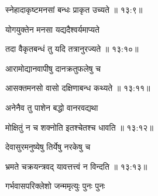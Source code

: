 
{\devanagarifont स्नेहादाकृष्टमनसां बन्धः प्राकृत उच्यते {॥ १३:९॥} \veg\dontdisplaylinenum }%

{\devanagarifont योगयुक्तेन मनसा यद्यदैश्वर्यमाप्यते \thinspace{\dandab} \dontdisplaylinenum }%
 

{\devanagarifont तदा वैकृतबन्धं तु यदि तत्रानुरज्यते {॥ १३:१०॥} \veg\dontdisplaylinenum }%

{\devanagarifont आरामोद्यानवापीषु दानक्रतुफलेषु च \thinspace{\dandab} \dontdisplaylinenum }%
 

{\devanagarifont आसक्तमनसो वासो दक्षिणाबन्ध कथ्यते {॥ १३:११॥} \veg\dontdisplaylinenum }%

{\devanagarifont अनेनैव तु पाशेन बद्धो वानरवद्यथा \thinspace{\dandab} \dontdisplaylinenum }%


{\devanagarifont मोक्षितुं न च शक्नोति इतश्चेतश्च धावति {॥ १३:१२॥} \veg\dontdisplaylinenum }%
 
{\devanagarifont देवासुरमनुष्येषु तिर्येषु नरकेषु च \thinspace{\dandab} \dontdisplaylinenum }%
 

{\devanagarifont भ्रमते चक्रयन्त्रवद् यावत्तत्त्वं न विन्दति {॥ १३:१३॥} \veg\dontdisplaylinenum }%

{\devanagarifont गर्भवासपरिक्लेशो जन्ममृत्युः पुनः पुनः \thinspace{\dandab} \dontdisplaylinenum }%


